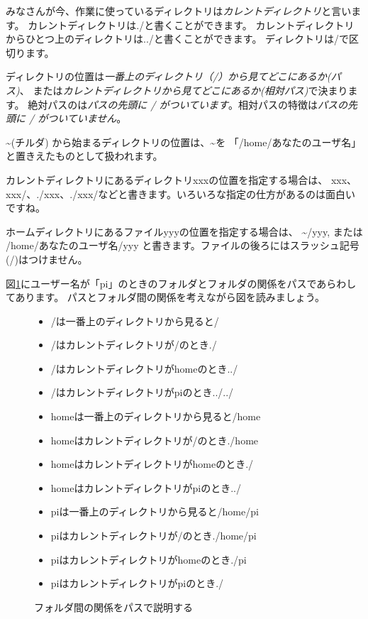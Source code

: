 みなさんが今、作業に使っているディレクトリは\emph{カレントディレクトリ}と言います。
カレントディレクトリは./と書くことができます。
カレントディレクトリからひとつ上のディレクトリは../と書くことができます。
ディレクトリは/で区切ります。

ディレクトリの位置は\emph{一番上のディレクトリ（/）から見てどこにあるか(パス)}、
または\emph{カレントディレクトリから見てどこにあるか(相対パス)}で決まります。
絶対パスのは\emph{パスの先頭に / がついています}。相対パスの特徴は\emph{パスの先頭に / がついていません}。

\textasciitilde (チルダ) から始まるディレクトリの位置は、\textasciitilde を
「/home/あなたのユーザ名」と置きえたものとして扱われます。

カレントディレクトリにあるディレクトリxxxの位置を指定する場合は、
xxx、xxx/、./xxx、./xxx/などと書きます。いろいろな指定の仕方があるのは面白いですね。

ホームディレクトリにあるファイルyyyの位置を指定する場合は、
\textasciitilde /yyy, または /home/あなたのユーザ名/yyy と書きます。ファイルの後ろにはスラッシュ記号(/)はつけません。

図\ref{fig:folder-path}にユーザー名が「pi」のときのフォルダとフォルダの関係をパスであらわしてあります。
パスとフォルダ間の関係を考えながら図を読みましょう。

\begin{figure}[H]
    \begin{minipage}{0.4\hsize}
        
    \end{minipage}
    \begin{minipage}{0.6\hsize}
        \begin{itemize}
        \item /は一番上のディレクトリから見ると/
        \item /はカレントディレクトリが/のとき./
        \item /はカレントディレクトリがhomeのとき../
        \item /はカレントディレクトリがpiのとき../../
        \item homeは一番上のディレクトリから見ると/home
        \item homeはカレントディレクトリが/のとき./home
        \item homeはカレントディレクトリがhomeのとき./
        \item homeはカレントディレクトリがpiのとき../
        \item piは一番上のディレクトリから見ると/home/pi
        \item piはカレントディレクトリが/のとき./home/pi
        \item piはカレントディレクトリがhomeのとき./pi
        \item piはカレントディレクトリがpiのとき./
        \end{itemize}
    \end{minipage}
    \caption{フォルダ間の関係をパスで説明する}
    \label{fig:folder-path}
\end{figure}

